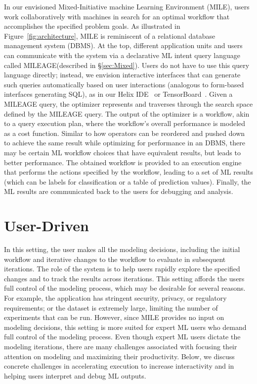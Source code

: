 \documentclass[11pt,dvipdfmx]{article}
\newcommand{\system}{{\sf MILE}\xspace}
\newcommand{\systemLang}{{\sf MILEAGE}\xspace}
\begin{document}
In our envisioned Mixed-Initiative machine Learning Environment (\system), users work collaboratively with machines in search for an optimal workflow that accomplishes the specified problem goals. As illustrated in Figure~\ref{fig:architecture}, \system is reminiscent of a relational database management system (DBMS). At the top, different application units and users can communicate with the system via a declarative ML intent query language called \systemLang (described in \S\ref{sec:Mixed}). Users do not have to use this query language directly; instead, we envision interactive interfaces that can generate such queries automatically based on user interactions (analogous to form-based interfaces generating SQL), as in our Helix IDE~\cite{helixDEMO} or TensorBoard~\cite{manetensorboard}. Given a \systemLang query, the optimizer represents and traverses through the search space defined by the \systemLang query. The output of the optimizer is a workflow, akin to a query execution plan, where the workflow's overall performance is modeled as a cost function. Similar to how operators can be reordered and pushed down to achieve the same result while optimizing for performance in an DBMS, there may be certain ML workflow choices that have equivalent results, but leads to better performance.
The obtained workflow is provided to an execution engine that performs the actions specified by the workflow, leading to a set of ML results (which can be labels for classification or a table of prediction values). Finally, the ML results are communicated back to the users for debugging and analysis.


\section{User-Driven}
\label{sec:manual}
In this setting, the user makes all the modeling decisions, 
including the initial workflow 
and iterative changes to the workflow to evaluate in subsequent iterations.
The role of the system is to help users rapidly explore the specified changes
and to track the results across iterations. 
This setting affords the users full control of the modeling process, which may be desirable for several reasons.
For example, the application has stringent security, privacy, or regulatory requirements;
or the dataset is extremely large, limiting the number of experiments that can be run.
However, since \system provides no input on modeling decisions,
this setting is more suited for expert ML users 
who demand full control of the modeling process. 
Even though expert ML users dictate the modeling iterations, 
there are many challenges associated with
focusing their attention on modeling and maximizing their productivity.
Below, we discuss concrete challenges in accelerating execution to increase interactivity 
and in helping users interpret and debug ML outputs.
\end{document}
